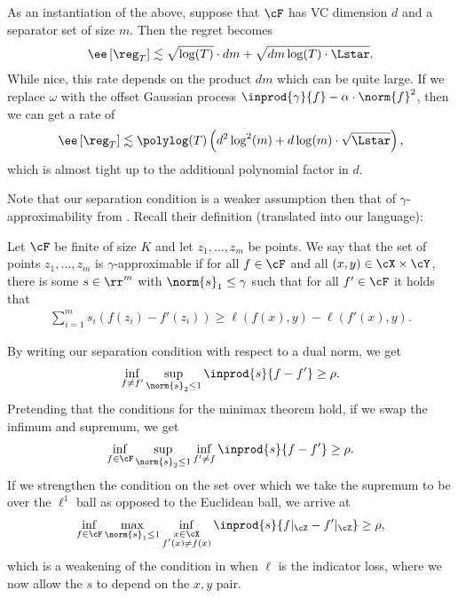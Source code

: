 As an instantiation of the above, suppose that $\cF$ has VC dimension $d$ and a separator set of size $m$.  Then the regret becomes
\begin{align}
    \ee\left[ \reg_T \right] \lesssim \sqrt{\log(T)} \cdot d m + \sqrt{d m \log(T) \cdot \Lstar}.
\end{align}
While nice, this rate depends on the product $dm$ which can be quite large.  If we replace $\omega$ with the offset Gaussian process $\inprod{\gamma}{f} - \alpha \cdot \norm{f}^2$, then we can get a rate of
\begin{align}
    \ee\left[ \reg_T \right] \lesssim \polylog(T) \left( d^2\log^2(m) + d \log(m) \cdot \sqrt{\Lstar} \right),
\end{align}
which is almost tight up to the additional polynomial factor in $d$.






Note that our separation condition is a weaker assumption then that of $\gamma$-approximability from \citet{wang2022adaptive}.  Recall their definition (translated into our language):
\begin{definition}\label{def:strong_separation}
    Let $\cF$ be finite of size $K$ and let $z_1, \dots, z_m$ be points.  We say that the set of points $z_1, \dots, z_m$ is $\gamma$-approximable if for all $f \in \cF$ and all $(x,y) \in \cX \times \cY$, there is some $s \in \rr^m$ with $\norm{s}_1 \leq \gamma$ such that for all $f' \in \cF$ it holds that
    \begin{align}
        \sum_{i = 1}^m s_i (f(z_i) - f'(z_i)) \geq \ell(f(x), y) - \ell(f'(x), y).
    \end{align}
\end{definition}
By writing our separation condition with respect to a dual norm, we get
\begin{align}
    \inf_{f \neq f'} \sup_{\norm{s}_2 \leq 1}  \inprod{s}{f - f'} \geq  \rho.
\end{align}
Pretending that the conditions for the minimax theorem hold, if we swap the infimum and supremum, we get
\begin{align}
    \inf_{f \in \cF} \sup_{\norm{s}_2 \leq 1} \inf_{f' \neq f} \inprod{s}{f - f'} \geq  \rho.
\end{align}
If we strengthen the condition on the set over which we take the supremum to be over the $\ell^1$ ball as opposed to the Euclidean ball, we arrive at
\begin{align}
    \inf_{f \in \cF} \max_{\norm{s}_1 \leq 1} \inf_{\substack{x \in \cX \\ f'(x) \neq f(x)}} \inprod{s}{f|_{\cZ} - f'|_{\cZ}} \geq  \rho,
\end{align}
which is a weakening of the condition in  when $\ell$ is the indicator loss, where we now allow the $s$ to depend on the $x,y$ pair.

